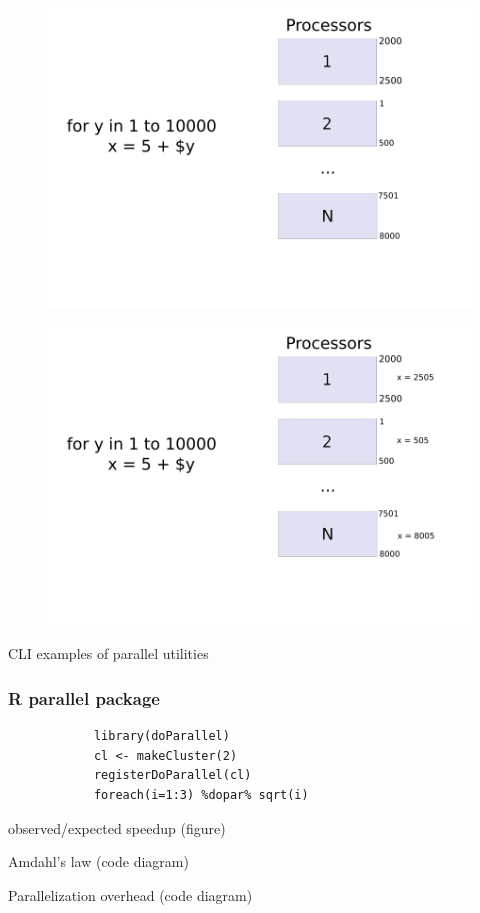 
\begin{frame}
		\begin{figure}
				\includegraphics[width=0.8\linewidth]{figures/diagrams/forloop/fordiagram}
		\end{figure}	
\end{frame}

\begin{frame}
		\begin{figure}
				\includegraphics[width=0.8\linewidth]{figures/diagrams/forloop/fordiagram2}
		\end{figure}	
\end{frame}

\begin{frame}
		CLI examples of parallel utilities
\end{frame}


\begin{frame}[fragile]
		\frametitle{R parallel package}
		\center
		\begin{verbatim}
			library(doParallel)
			cl <- makeCluster(2)
			registerDoParallel(cl)
			foreach(i=1:3) %dopar% sqrt(i)
		\end{verbatim}
\end{frame}

\begin{frame}
		observed/expected speedup (figure)
\end{frame}

\begin{frame}
		Amdahl's law (code diagram)
\end{frame}

\begin{frame}
		Parallelization overhead (code diagram)
\end{frame}

